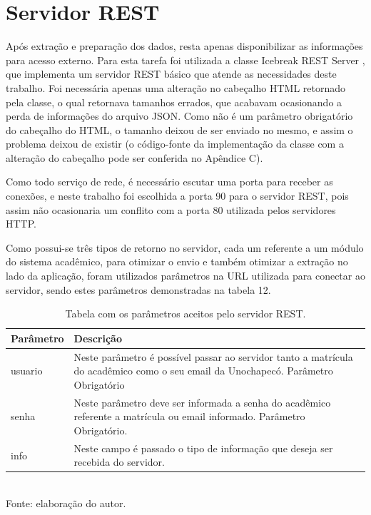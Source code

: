 \section{Servidor REST}
Após extração e preparação dos dados, resta apenas disponibilizar as informações para acesso externo. Para esta tarefa foi utilizada a classe Icebreak REST Server \cite{IcebreakRestServer}, que implementa um servidor REST básico que atende as necessidades deste trabalho. Foi necessária apenas uma alteração no cabeçalho HTML retornado pela classe, o qual retornava tamanhos errados, que acabavam ocasionando a perda de informações do arquivo JSON. Como não é um parâmetro obrigatório do cabeçalho do HTML, o tamanho deixou de ser enviado no mesmo, e assim o problema deixou de existir (o código-fonte da implementação da classe com a alteração do cabeçalho pode ser conferida no Apêndice C). 

Como todo serviço de rede, é necessário escutar uma porta para receber as conexões, e neste trabalho foi escolhida a porta 90 para o servidor REST, pois assim não ocasionaria um conflito com a porta 80 utilizada pelos servidores HTTP.

Como possui-se três tipos de retorno no servidor, cada um referente a um módulo do sistema acadêmico, para otimizar o envio e também otimizar a extração no lado da aplicação, foram utilizados parâmetros na URL utilizada para conectar ao servidor, sendo estes parâmetros demonstradas na tabela 12.

\begin{table}[!hbt]
\centering
\caption[Servidor REST - Parâmetros do Servidor]{Tabela com os parâmetros aceitos pelo servidor REST.}
\vspace{3mm}
\begin{tabular}{p{3cm}|p{9cm}}\hline
\textbf{Parâmetro} & \textbf{Descrição} \\ \hline
usuario            & Neste parâmetro é possível passar ao servidor tanto a matrícula do acadêmico como o seu email da Unochapecó. Parâmetro Obrigatório  \\ \hline
senha              & Neste parâmetro deve ser informada a senha do acadêmico referente a matrícula ou email informado. Parâmetro Obrigatório. \\ \hline
info               & Neste campo é passado o tipo de informação que deseja ser recebida do servidor. \\ \hline
\end{tabular}
\\ Fonte: elaboração do autor.
\end{table}

